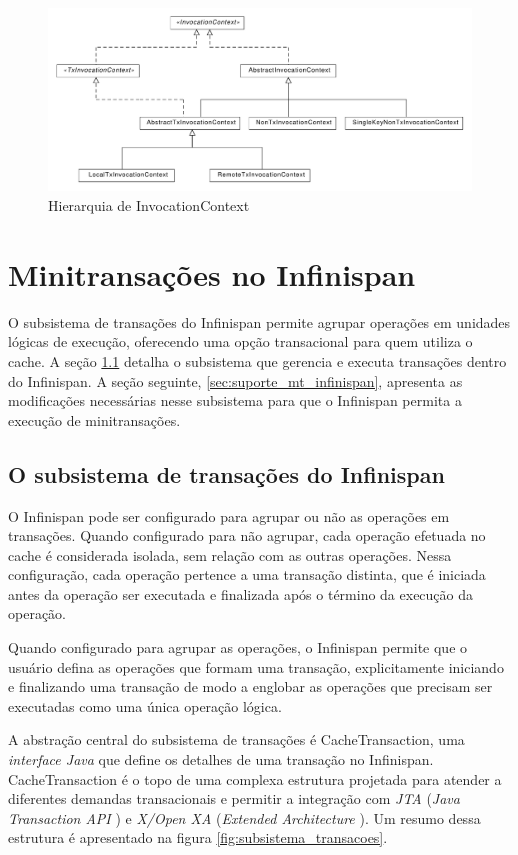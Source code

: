 \documentclass[11pt,twoside,a4paper]{book}
\begin{document}
\begin{figure}
  \centering
  \includegraphics[width=\textwidth]{invocation_context} 
  \caption{Hierarquia de InvocationContext}
  \label{fig:invocation_context} 
\end{figure}

\section{Minitransações no Infinispan}
\label{sec:mt_infinispan}
O subsistema de transações do Infinispan permite agrupar operações em unidades lógicas de execução, oferecendo uma opção transacional para quem utiliza o cache. A seção \ref{sec:tx_infinispan} detalha o subsistema que gerencia e executa transações dentro do Infinispan. A seção seguinte, \ref{sec:suporte_mt_infinispan}, apresenta as modificações necessárias nesse subsistema para que o Infinispan permita a execução de minitransações.

\subsection{O subsistema de transações do Infinispan}
\label{sec:tx_infinispan}
O Infinispan pode ser configurado para agrupar ou não as operações em transações. Quando configurado para não agrupar, cada operação efetuada no cache é considerada isolada, sem relação com as outras operações. Nessa configuração, cada operação pertence a uma transação distinta, que é iniciada antes da operação ser executada e finalizada após o término da execução da operação.

Quando configurado para agrupar as operações, o Infinispan permite que o usuário defina as operações que formam uma transação, explicitamente iniciando e finalizando uma transação de modo a englobar as operações que precisam ser executadas como uma única operação lógica.

A abstração central do subsistema de transações é CacheTransaction, uma \emph{interface Java} \cite{java} que define os detalhes de uma transação no Infinispan. CacheTransaction é o topo de uma complexa estrutura projetada para atender a diferentes demandas transacionais e permitir a integração com \emph{JTA} (\emph{Java Transaction API} \cite{jta}) e \emph{X/Open XA} (\emph{Extended Architecture} \cite{xa}). Um resumo dessa estrutura é apresentado na figura \ref{fig:subsistema_transacoes}.
\end{document}
